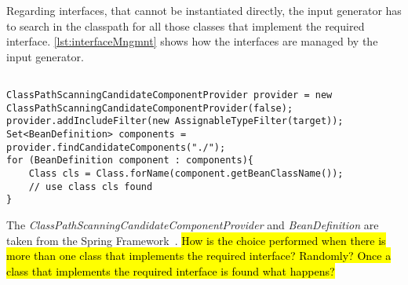Regarding interfaces, that cannot be instantiated directly, the input generator has to search in the classpath for all those classes that implement the required interface. \autoref{lst:interfaceMngmnt} shows how the interfaces are managed by the input generator.

\begin{lstlisting}[caption={how to find a sub-class of an interface},label={lst:interfaceMngmnt}]% Start your code-block

ClassPathScanningCandidateComponentProvider provider = new ClassPathScanningCandidateComponentProvider(false);
provider.addIncludeFilter(new AssignableTypeFilter(target));
Set<BeanDefinition> components = provider.findCandidateComponents("./");
for (BeanDefinition component : components){
	Class cls = Class.forName(component.getBeanClassName());
	// use class cls found
}
\end{lstlisting}
The \textit{ClassPathScanningCandidateComponentProvider} and \textit{BeanDefinition} are taken from the Spring Framework~\cite{springFramework}.
\hl{How is the choice performed when there is more than one class that implements the required interface? Randomly? Once a class that implements the required interface is found what happens?}

